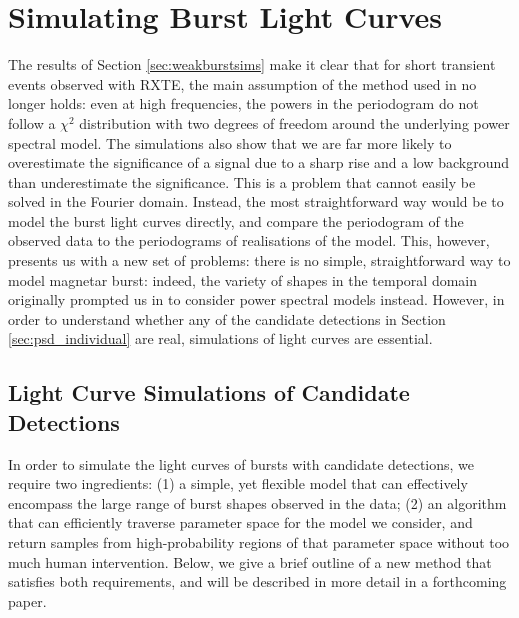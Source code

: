 \documentclass[numberedappendix]{emulateapj}
\begin{document}
\section{Simulating Burst Light Curves}

The results of Section \ref{sec:weakburstsims} make it clear that for short transient events observed with RXTE, the main assumption of the method used in \citet{huppenkothen13} no longer holds: even at high frequencies, the powers in the periodogram do not follow a $\chi^2$ distribution with two degrees of freedom around the underlying power spectral model. The simulations also show that we are far more likely to overestimate the significance of a signal due to a sharp rise and a low background than underestimate the significance. This is a problem that cannot easily be solved in the Fourier domain. Instead, the most straightforward way would be to model the burst light curves directly, and compare the periodogram of the observed data to the periodograms of realisations of the model. This, however, presents us with a new set of problems: there is no simple, straightforward way to model magnetar burst: indeed, the variety of shapes in the temporal domain originally prompted us in \citet{huppenkothen13} to consider power spectral models instead. However, in order to understand whether any of the candidate detections in Section \ref{sec:psd_individual} are real, simulations of light curves are essential. 

\subsection{Light Curve Simulations of Candidate Detections}

In order to simulate the light curves of bursts with candidate detections, we require two ingredients: (1) a simple, yet flexible model that can effectively encompass the large range of burst shapes observed in the data; (2) an algorithm that can efficiently traverse parameter space for the model we consider, and return samples from high-probability regions of that parameter space without too much human intervention. Below, we give a brief outline of a new method that satisfies both requirements, and will be described in more detail in a forthcoming paper.
\end{document}

